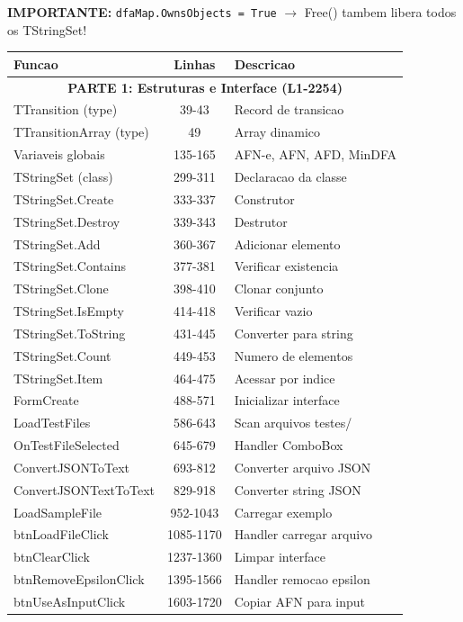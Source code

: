 \documentclass[12pt,a4paper]{article}
\begin{document}
\textbf{IMPORTANTE:} \texttt{dfaMap.OwnsObjects = True} $\rightarrow$ Free() tambem libera todos os TStringSet!

\begin{table}[ht]
\centering
\small
\begin{tabular}{|l|c|p{5cm}|}
\hline
\textbf{Funcao} & \textbf{Linhas} & \textbf{Descricao} \\
\hline
\multicolumn{3}{|c|}{\textbf{PARTE 1: Estruturas e Interface (L1-2254)}} \\
\hline
TTransition (type) & 39-43 & Record de transicao \\
TTransitionArray (type) & 49 & Array dinamico \\
Variaveis globais & 135-165 & AFN-e, AFN, AFD, MinDFA \\
TStringSet (class) & 299-311 & Declaracao da classe \\
TStringSet.Create & 333-337 & Construtor \\
TStringSet.Destroy & 339-343 & Destrutor \\
TStringSet.Add & 360-367 & Adicionar elemento \\
TStringSet.Contains & 377-381 & Verificar existencia \\
TStringSet.Clone & 398-410 & Clonar conjunto \\
TStringSet.IsEmpty & 414-418 & Verificar vazio \\
TStringSet.ToString & 431-445 & Converter para string \\
TStringSet.Count & 449-453 & Numero de elementos \\
TStringSet.Item & 464-475 & Acessar por indice \\
FormCreate & 488-571 & Inicializar interface \\
LoadTestFiles & 586-643 & Scan arquivos testes/ \\
OnTestFileSelected & 645-679 & Handler ComboBox \\
ConvertJSONToText & 693-812 & Converter arquivo JSON \\
ConvertJSONTextToText & 829-918 & Converter string JSON \\
LoadSampleFile & 952-1043 & Carregar exemplo \\
btnLoadFileClick & 1085-1170 & Handler carregar arquivo \\
btnClearClick & 1237-1360 & Limpar interface \\
btnRemoveEpsilonClick & 1395-1566 & Handler remocao epsilon \\
btnUseAsInputClick & 1603-1720 & Copiar AFN para input \\

\end{tabular}
\end{table}
\end{document}
